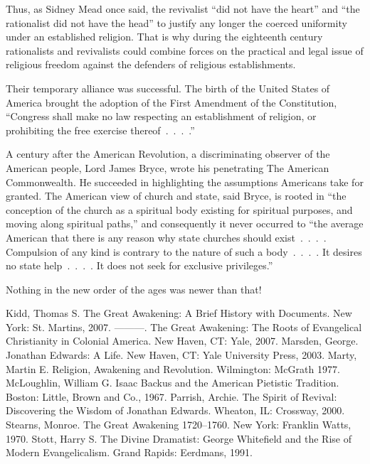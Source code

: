 Thus, as Sidney Mead once said, the revivalist “did not have the heart” and “the rationalist did not
have the head” to justify any longer the coerced uniformity under an established religion. That is
why during the eighteenth century rationalists and revivalists could combine forces on the practical
and legal issue of religious freedom against the defenders of religious establishments.

Their temporary alliance was successful. The birth of the United States of America brought the
adoption of the First Amendment of the Constitution, “Congress shall make no law respecting an
establishment of religion, or prohibiting the free exercise thereof~.~.~.~.”

A century after the American Revolution, a discriminating observer of the American people, Lord
James Bryce, wrote his penetrating The American Commonwealth. He succeeded in highlighting the
assumptions Americans take for granted. The American view of church and state, said Bryce, is rooted
in “the conception of the church as a spiritual body existing for spiritual purposes, and moving
along spiritual paths,” and consequently it never occurred to “the average American that there is
any reason why state churches should exist~.~.~.~. Compulsion of any kind is contrary to the nature
of such a body~.~.~.~. It desires no state help~.~.~.~. It does not seek for exclusive privileges.”

Nothing in the new order of the ages was newer than that!

\begin{readinglist}
\entry *Kidd, Thomas S. The Great Awakening: A Brief History with Documents. New York: St. Martins,
  2007.
\entry ———. The Great Awakening: The Roots of Evangelical Christianity in Colonial America. New
  Haven, CT: Yale, 2007.
\entry Marsden, George. Jonathan Edwards: A Life. New Haven, CT: Yale University Press, 2003.
\entry Marty, Martin E. Religion, Awakening and Revolution. Wilmington: McGrath 1977.
\entry McLoughlin, William G. Isaac Backus and the American Pietistic Tradition. Boston: Little,
  Brown and Co., 1967.
\entry Parrish, Archie. The Spirit of Revival: Discovering the Wisdom of Jonathan Edwards. Wheaton,
  IL: Crossway, 2000.
\entry Stearns, Monroe. The Great Awakening 1720–1760. New York: Franklin Watts, 1970.
\entry Stott, Harry S. The Divine Dramatist: George Whitefield and the Rise of Modern
  Evangelicalism. Grand Rapids: Eerdmans, 1991.
\end{readinglist}
